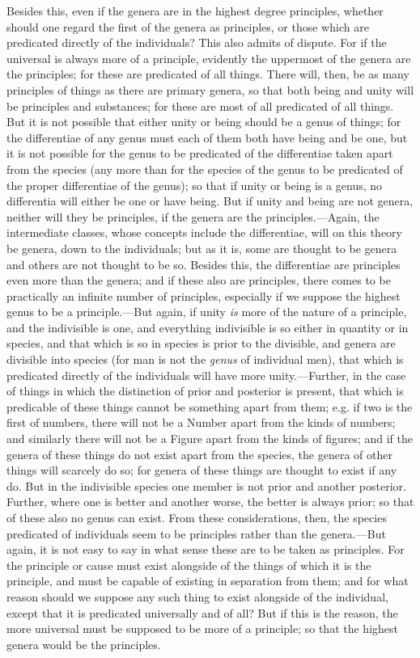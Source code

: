 Besides this, even if the genera are in the highest degree principles, whether should one regard the first of the genera as principles, or those which are predicated directly of the individuals? This also admits of dispute. For if the universal is always more of a principle, evidently the uppermost of the genera are the principles; for these are predicated of all things. There will, then, be as many principles of things as there are primary genera, so that both being and unity will be principles and substances; for these are most of all predicated of all things. But it is not possible that either unity or being should be a genus of things; for the differentiae of any genus must each of them both have being and be one, but it is not possible for the genus to be predicated of the differentiae taken apart from the species (any more than for the species of the genus to be predicated of the proper differentiae of the genus); so that if unity or being is a genus, no differentia will either be one or have being. But if unity and being are not genera, neither will they be principles, if the genera are the principles.—Again, the intermediate classes, whose concepts include the differentiae, will on this theory be genera, down to the individuals; but as it is, some are thought to be genera and others are not thought to be so. Besides this, the differentiae are principles even more than the genera; and if these also are principles, there comes to be practically an infinite number of principles, especially if we suppose the highest genus to be a principle.—But again, if unity \emph{is} more of the nature of a principle, and the indivisible is one, and everything indivisible is so either in quantity or in species, and that which is so in species is prior to the divisible, and genera are divisible into species (for man is not the \emph{genus} of individual men), that which is predicated directly of the individuals will have more unity.—Further, in the case of things in which the distinction of prior and posterior is present, that which is predicable of these things cannot be something apart from them; e.g. if two is the first of numbers, there will not be a Number apart from the kinds of numbers; and similarly there will not be a Figure apart from the kinds of figures; and if the genera of these things do not exist apart from the species, the genera of other things will scarcely do so; for genera of these things are thought to exist if any do. But in the indivisible species one member is not prior and another posterior. Further, where one is better and another worse, the better is always prior; so that of these also no genus can exist. From these considerations, then, the species predicated of individuals seem to be principles rather than the genera.—But again, it is not easy to say in what sense these are to be taken as principles. For the principle or cause must exist alongside of the things of which it is the principle, and must be capable of existing in separation from them; and for what reason should we suppose any such thing to exist alongside of the individual, except that it is predicated universally and of all? But if this is the reason, the more universal must be supposed to be more of a principle; so that the highest genera would be the principles.

